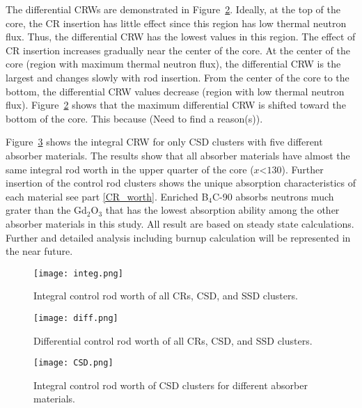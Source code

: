 The differential CRWs are demonstrated in Figure~\ref{fig:diff}. Ideally, at the top of the core, the CR insertion has little effect since this region has low thermal neutron flux. Thus, the differential CRW has the lowest values in this region. The effect of CR insertion increases gradually near the center of the core. At the center of the core (region with maximum thermal neutron flux), the differential CRW is the largest and changes slowly with rod insertion. From the center of the core to the bottom, the differential CRW values decrease (region with low thermal neutron flux). Figure~\ref{fig:diff} shows that the maximum differential CRW  is shifted toward the bottom of the core. This because (Need to find a reason(s)).

Figure~\ref{fig:CSD} shows the integral CRW for only CSD clusters with five different absorber materials. The results show that all absorber materials have almost the same integral rod worth in the upper quarter of the core ($x$<$130$). Further insertion of the control rod clusters shows the unique absorption characteristics of each material see part \ref{CR_worth}. Enriched B$_4$C-90 absorbs neutrons much grater than the Gd$_2$O$_3$ that has the lowest absorption ability among the other absorber materials in this study. All result are based on steady state calculations. Further and detailed analysis including burnup calculation will be represented in the near future.

\begin{figure}
	\centering
	\texttt{[image: integ.png]}
	\vspace{-0.5in}
	\caption{Integral control rod worth of all CRs, CSD, and SSD clusters.} 
	\label{fig:integ}
\end{figure}

\begin{figure}
	\centering
	\texttt{[image: diff.png]}
	\vspace{-0.5in}
	\caption{Differential control rod worth of all CRs, CSD, and SSD clusters.} 
	\label{fig:diff}
\end{figure}

\begin{figure}
	\centering
	\texttt{[image: CSD.png]}
	\vspace{-0.5in}
	\caption{Integral control rod worth of CSD clusters for different absorber materials.} 
	\label{fig:CSD}
\end{figure}